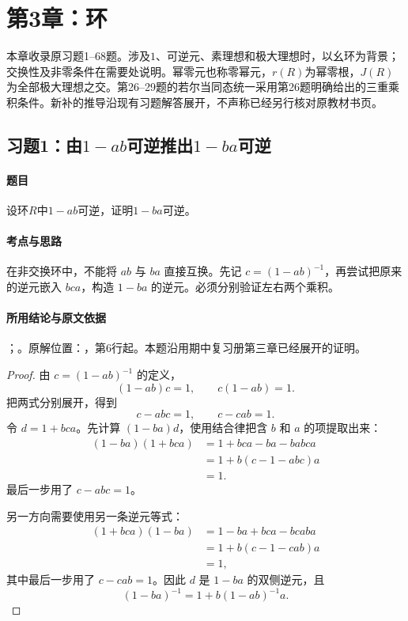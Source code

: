 

\clearpage\section{第3章：环}


本章收录原习题1--68题。涉及$1$、可逆元、素理想和极大理想时，以幺环为背景；交换性及非零条件在需要处说明。幂零元也称零幂元，$r(R)$为幂零根，$J(R)$为全部极大理想之交。第26--29题的若尔当同态统一采用第26题明确给出的三重乘积条件。新补的推导沿现有习题解答展开，不声称已经另行核对原教材书页。


\subsection{习题1：由\texorpdfstring{$1-ab$}{1-ab}可逆推出\texorpdfstring{$1-ba$}{1-ba}可逆}

\label{ex:3:1}

\paragraph{题目}

设环$R$中$1-ab$可逆，证明$1-ba$可逆。

\paragraph{考点与思路}

在非交换环中，不能将 $ab$ 与 $ba$ 直接互换。先记 $c=(1-ab)^{-1}$，再尝试把原来的逆元嵌入 $bca$，构造 $1-ba$ 的逆元。必须分别验证左右两个乘积。

\paragraph{所用结论与原文依据}

；。原解位置：，第6行起。本题沿用期中复习册第三章已经展开的证明。


\begin{proof}

由 $c=(1-ab)^{-1}$ 的定义，
\[
(1-ab)c=1,\qquad c(1-ab)=1.
\]
把两式分别展开，得到
\[
c-abc=1,\qquad c-cab=1.
\]
令 $d=1+bca$。先计算 $(1-ba)d$，使用结合律把含 $b$ 和 $a$ 的项提取出来：
\begin{align*}
(1-ba)(1+bca)
  &=1+bca-ba-babca\\
  &=1+b(c-1-abc)a\\
  &=1.
\end{align*}
最后一步用了 $c-abc=1$。

另一方向需要使用另一条逆元等式：
\begin{align*}
(1+bca)(1-ba)
  &=1-ba+bca-bcaba\\
  &=1+b(c-1-cab)a\\
  &=1,
\end{align*}
其中最后一步用了 $c-cab=1$。因此 $d$ 是 $1-ba$ 的双侧逆元，且
\[
\boxed{(1-ba)^{-1}=1+b(1-ab)^{-1}a.}
\]

\end{proof}

